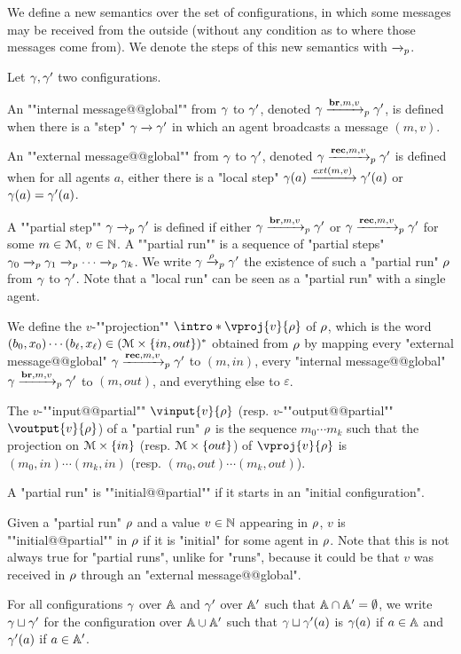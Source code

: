 We define a new semantics over the set of configurations, in which some messages may be received from the outside (without any condition as to where those messages come from). We denote the steps of this new semantics with $\xrightarrow{}_{p}$.  
\begin{definition}
	Let $\gamma, \gamma'$ two configurations. 
	
	An ""internal message@@global"" from $\gamma$ to $\gamma'$, denoted $\gamma \xrightarrow{\textbf{br}, m, v}_{p} \gamma'$, is defined when there is a "step" $\gamma \xrightarrow{} \gamma'$ in which an agent broadcasts a message $(m,v)$. 
	
	An ""external message@@global"" from $\gamma$ to $\gamma'$, denoted $\gamma \xrightarrow{\textbf{rec}, m, v}_{p} \gamma'$ is defined when for all agents $a$, either there is a "local step" $\config(a) \extbr{m}{v} \config'(a)$ or $\gamma(a) = \gamma'(a)$.
	
	A ""partial step"" $\gamma \xrightarrow{}_{p} \gamma'$ is defined if either $\gamma \xrightarrow{\textbf{br}, m, v}_{p} \gamma'$ or $\gamma \xrightarrow{\textbf{rec}, m, v}_{p} \gamma'$ for some $m \in \mathcal{M}$, $v\in \mathbb{N}$.
	A ""partial run"" is a sequence of "partial steps" $\gamma_0 \xrightarrow{}_{p} \gamma_1  \xrightarrow{}_{p} \cdots \xrightarrow{}_{p} \gamma_k$. We write $\gamma \xrightarrow{\rho}_{p} \gamma'$ the existence of such a "partial run" $\rho$ from $\gamma$ to $\gamma'$.
	Note that a "local run" can be seen as a "partial run" with a single agent.

	We define the $v$-""projection"" $\intro*\vproj{\aval}{\run}$ of $\rho$, which is the word $(b_0, x_0) \cdots (b_\ell, x_\ell) \in (\mathcal{M} \times \{in, out\})^*$ obtained from $\rho$ by mapping every "external message@@global" $\gamma \xrightarrow{\textbf{rec}, m, v}_{p} \gamma'$ to $(m, in)$, every "internal message@@global" $\gamma \xrightarrow{\textbf{br}, m, v}_{p} \gamma'$ to $(m, out)$, and everything else to $\varepsilon$.
	
	\AP The $v$-""input@@partial"" $\vinput{v}{\run}$ (resp. $v$-""output@@partial"" $\voutput{v}{\run}$) of a "partial run" $\rho$ is the sequence $m_0 \cdots m_k$ such that the projection on $\mathcal{M} \times \{in\}$ (resp. $\mathcal{M}\times \{out\}$) of $\vproj{v}{\run}$ is $(m_0, in) \cdots (m_k, in)$ (resp. $(m_0, out)\cdots(m_k, out)$).
	
	\AP A "partial run" is ""initial@@partial"" if it starts in an "initial configuration".
	
	\AP Given a "partial run" $\rho$ and a value $v \in \mathbb{N}$ appearing in $\rho$, $v$ is ""initial@@partial"" in $\rho$ if it is "initial" for some agent in $\rho$. Note that this is not always true for "partial runs", unlike for "runs", because it could be that $v$ was received in $\rho$ through an "external message@@global". 

	For all configurations $\gamma$ over $\mathbb{A}$ and $\gamma'$ over $\mathbb{A}'$ such that $\mathbb{A} \cap \mathbb{A}' = \emptyset$, we write $\gamma \sqcup \gamma'$ for the configuration over $\mathbb{A} \cup \mathbb{A}'$ such that $\gamma \sqcup \gamma'(a)$ is $\gamma(a)$ if $a \in \mathbb{A}$ and $\gamma'(a)$ if $a \in \mathbb{A}'$. 

	\end{definition}

